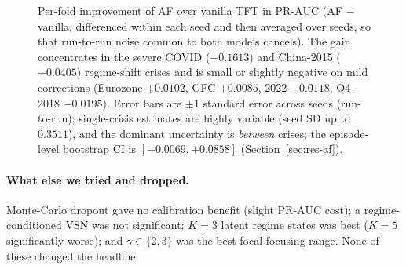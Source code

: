 \documentclass[11pt,a4paper]{article}
\newcommand{\prauc}{\mbox{PR-AUC}}
\begin{document}
\begin{figure}[t]
\centering
{}
\caption{Per-fold improvement of AF over vanilla TFT in $\prauc$ (AF $-$
vanilla, differenced within each seed and then averaged over seeds, so that
run-to-run noise common to both models cancels). The gain concentrates in the
severe COVID ($+0.1613$) and China-2015 ($+0.0405$) regime-shift crises and is
small or slightly negative on mild corrections (Eurozone $+0.0102$, GFC
$+0.0085$, 2022 $-0.0118$, Q4-2018 $-0.0195$). Error bars are $\pm1$ standard
error across seeds (run-to-run); single-crisis estimates are highly variable
(seed SD up to $0.3511$), and the dominant uncertainty is \emph{between}
crises; the episode-level bootstrap CI is $[-0.0069,+0.0858]$
(Section~\ref{sec:res-af}).}
\label{fig:perfold}
\end{figure}

\paragraph{What else we tried and dropped.} Monte-Carlo dropout gave no
calibration benefit (slight $\prauc$ cost); a regime-conditioned VSN was not
significant; $K=3$ latent regime states was best ($K=5$ significantly worse);
and $\gamma\in\{2,3\}$ was the best focal focusing range. None of these
changed the headline.
\end{document}
